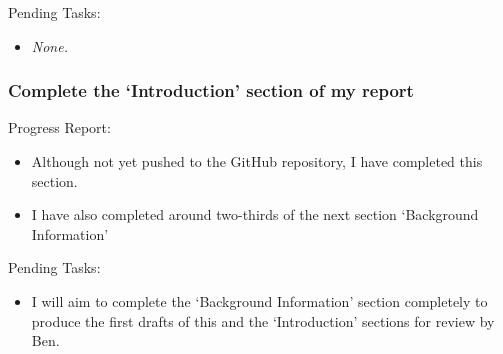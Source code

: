 Pending Tasks:

\begin{itemize}
    \item \textit{None.}
\end{itemize}






\subsubsection{Complete the `Introduction' section of my report}

Progress Report:

\begin{itemize}
    \item Although not yet pushed to the GitHub repository, I have completed this section.
    \item I have also completed around two-thirds of the next section `Background Information'
\end{itemize}

Pending Tasks:

\begin{itemize}
    \item I will aim to complete the `Background Information' section completely to produce the first drafts of this and the `Introduction' sections for review by Ben.
\end{itemize}
